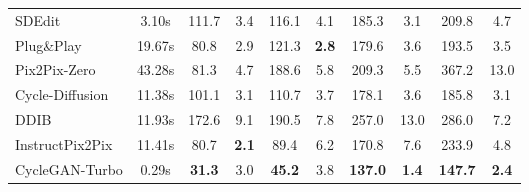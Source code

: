 \begin{frame}
\begin{table}
{\begin{tabular}{l c cc cc cc cc}
            \hdashline
    
            SDEdit \cite{meng2022sdedit} & 3.10s
            & 111.7 & 3.4 
            & 116.1 & 4.1 
            & 185.3 & 3.1
            & 209.8 & 4.7\\
    
            
            Plug\&Play \cite{tumanyan2022plugandplay} & 19.67s
            & 80.8 & 2.9 
            & 121.3 & \textbf{2.8} 
            & 179.6 & 3.6 
            & 193.5 & 3.5 \\
            
            Pix2Pix-Zero \cite{parmar2023zeroshot}  & 43.28s
            & 81.3 & 4.7 
            & 188.6 & 5.8
            & 209.3 & 5.5
            & 367.2 & 13.0
            \\
            
            Cycle-Diffusion \cite{cyclediffusion}  & 11.38s
            & 101.1 & 3.1 
            & 110.7 & 3.7 
            & 178.1 & 3.6 
            & 185.8 & 3.1\\
    
            DDIB \cite{su2022dual} & 11.93s
            & 172.6 & 9.1
            & 190.5 & 7.8 
            & 257.0 & 13.0 
            & 286.0 & 7.2  \\
    
            InstructPix2Pix \cite{brooks2023instructpix2pix} & 11.41s
            & 80.7 & \textbf{2.1} 
            & 89.4 & 6.2 
            & 170.8 & 7.6 
            & 233.9 & 4.8 
            \\
            \hdashline
    
            CycleGAN-Turbo & 0.29s
            & \textbf{31.3} & 3.0
            & \textbf{45.2} & 3.8 
            & \textbf{137.0} & \textbf{1.4}
            & \textbf{147.7} & \textbf{2.4} \\
    
            \bottomrule 
        \end{tabular}
        }
        \vspace{-18pt}
    
        \label{tab:cmp_driving_ds}
    \end{table}


\end{frame}


